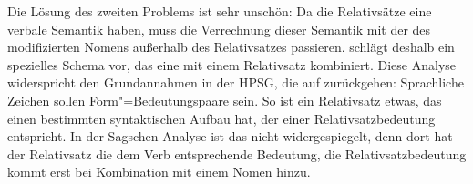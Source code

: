 
Die Lösung des zweiten Problems ist sehr unschön: Da die Relativsätze eine verbale Semantik haben,
muss die Verrechnung dieser Semantik mit der des modifizierten Nomens außerhalb des Relativsatzes
passieren. \citet[]{Sag97a} schlägt deshalb ein spezielles Schema vor, das eine \nbar mit
einem Relativsatz kombiniert. Diese Analyse widerspricht den Grundannahmen in der HPSG, die auf
\citet{Saussure16a-de} zurückgehen: Sprachliche Zeichen sollen Form"=Bedeutungspaare sein. So ist ein
Relativsatz etwas, das einen bestimmten syntaktischen Aufbau hat, der einer Relativsatzbedeutung
entspricht. In der Sagschen Analyse ist das nicht widergespiegelt, denn dort hat der Relativsatz die
dem Verb entsprechende Bedeutung, die Relativsatzbedeutung kommt erst bei Kombination mit einem
Nomen hinzu.

